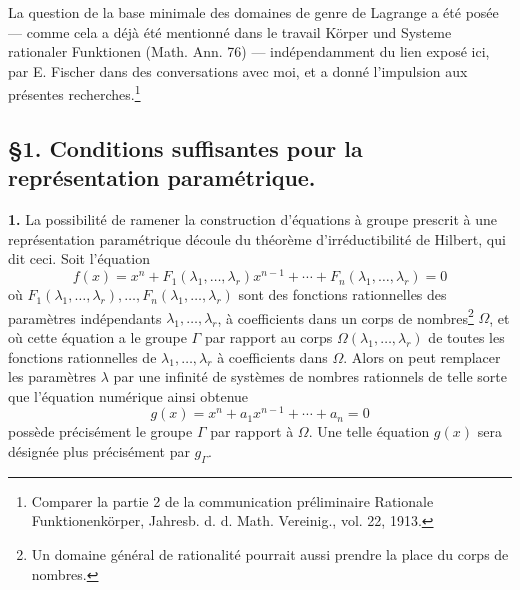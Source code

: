 La question de la base minimale des domaines de genre de Lagrange a été posée --- comme cela a déjà été mentionné dans le travail \og{}Körper und Systeme rationaler Funktionen\fg{} (Math. Ann. 76) --- indépendamment du lien exposé ici, par E. Fischer dans des conversations avec moi, et a donné l'impulsion aux présentes recherches.\footnote{Comparer la partie 2 de la communication préliminaire \og{}Rationale Funktionenkörper\fg{}, Jahresb. d. d. Math. Vereinig., vol. 22, 1913.}

\subsection*{\S 1. Conditions suffisantes pour la représentation paramétrique.}

\textbf{1.} La possibilité de ramener la construction d'équations à groupe prescrit à une représentation paramétrique découle du théorème d'irréductibilité de Hilbert, qui dit ceci. Soit l'équation
\begin{equation}\tag{1}
f(x)=x^n+F_1(\lambda_1,\ldots,\lambda_r)x^{n-1}+\cdots+F_n(\lambda_1,\ldots,\lambda_r)=0
\end{equation}
où $F_1(\lambda_1,
\ldots,\lambda_r),\ldots,F_n(\lambda_1,
\ldots,\lambda_r)$ sont des fonctions rationnelles des paramètres indépendants $\lambda_1,
\ldots,\lambda_r$, à coefficients dans un corps de nombres\footnote{Un domaine général de rationalité pourrait aussi prendre la place du corps de nombres.} $\Omega$, et où cette équation a le groupe $\Gamma$ par rapport au corps $\Omega(\lambda_1,
\ldots,\lambda_r)$ de toutes les fonctions rationnelles de $\lambda_1,
\ldots,\lambda_r$ à coefficients dans $\Omega$. Alors on peut remplacer les paramètres $\lambda$ par une infinité de systèmes de nombres rationnels de telle sorte que l'équation numérique ainsi obtenue
\begin{equation}\tag{2}
g(x)=x^n+a_1x^{n-1}+\cdots+a_n=0
\end{equation}
possède précisément le groupe $\Gamma$ par rapport à $\Omega$. Une telle équation $g(x)$ sera désignée plus précisément par $g_\Gamma$.


